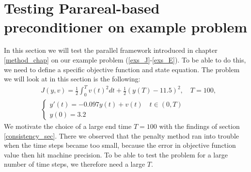 \section{Testing Parareal-based preconditioner on example problem}
In this section we will test the parallel framework introduced in chapter \ref{method_chap} on our example problem (\ref{exs_J}-\ref{exs_E}). To be able to do this, we need to define a specific objective function and state equation. The problem we will look at in this section is the following:
\begin{align}
&J(y,v) = \frac{1}{2}\int_0^{T}v(t)^2dt + \frac{1}{2}(y(T)-11.5)^2,\quad T=100, \label{speed_j}\\
&\left\{
     \begin{array}{lr}
       	y'(t)=-0.097y(t) + v(t) \quad t\in(0,T)\\
       	y(0)=3.2
     \end{array}
   \right. \label{speed_e}
\end{align}
We motivate the choice of a large end time $T=100$ with the findings of section \ref{consistency_sec}. There we observed that the penalty method ran into trouble when the time steps became too small, because the error in objective function value then hit machine precision. To be able to test the problem for a large number of time steps, we therefore need a large $T$. 
